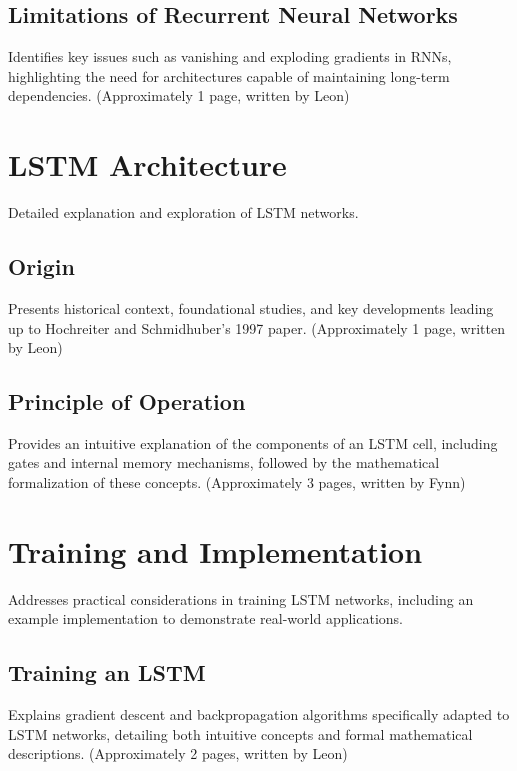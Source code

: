 \documentclass[twoside,a4paper,10pt,DIV=12,BCOR=12mm]{scrartcl}
\begin{document}
\subsection{Limitations of Recurrent Neural Networks}

Identifies key issues such as vanishing and exploding gradients in RNNs,
highlighting the need for architectures capable of maintaining long-term dependencies.
(Approximately 1 page, written by Leon)

\section{LSTM Architecture}

Detailed explanation and exploration of LSTM networks.

\subsection{Origin}

Presents historical context, foundational studies, and key developments leading up to Hochreiter and Schmidhuber's 1997 paper.
(Approximately 1 page, written by Leon)

\subsection{Principle of Operation}

Provides an intuitive explanation of the components of an LSTM cell,
including gates and internal memory mechanisms, followed by the mathematical formalization of these concepts.
(Approximately 3 pages, written by Fynn)

\section{Training and Implementation}

Addresses practical considerations in training LSTM networks, including an example implementation to demonstrate real-world applications.

\subsection{Training an LSTM}

Explains gradient descent and backpropagation algorithms specifically adapted to
LSTM networks, detailing both intuitive concepts and formal mathematical descriptions.
(Approximately 2 pages, written by Leon)
\end{document}
